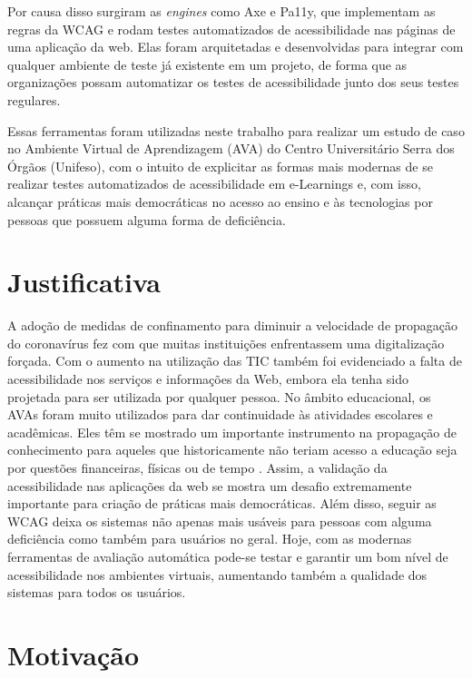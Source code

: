 \documentclass[
	12pt,				%
	openright,			%
	oneside,			%
	a4paper,			%
	chapter=TITLE,		%
	section=TITLE,		%
	subsection=TITLE,	%
	subsubsection=TITLE,%
	english,			%
	brazil				%
	]{abntex2}
\theoremstyle{definition}
\begin{document}
Por causa disso surgiram as \textit{engines} como Axe e Pa11y, que implementam as regras da WCAG e rodam testes automatizados de acessibilidade nas páginas de uma aplicação da web. Elas foram arquitetadas e desenvolvidas para integrar com qualquer ambiente de teste já existente em um projeto, de forma que as organizações possam automatizar os testes de acessibilidade junto dos seus testes regulares.

Essas ferramentas foram utilizadas neste trabalho para realizar um estudo de caso no Ambiente Virtual de Aprendizagem (AVA) do Centro Universitário Serra dos Órgãos (Unifeso), com o intuito de explicitar as formas mais modernas de se realizar testes automatizados de acessibilidade em e-Learnings e, com isso, alcançar práticas mais democráticas no acesso ao ensino e às tecnologias por pessoas que possuem alguma forma de deficiência.


\section{Justificativa}

A adoção de medidas de confinamento para diminuir a velocidade de propagação do coronavírus fez com que muitas instituições enfrentassem uma digitalização forçada. Com o aumento na utilização das TIC também foi evidenciado a falta de acessibilidade nos serviços e informações da Web, embora ela tenha sido projetada para ser utilizada por qualquer pessoa. No âmbito educacional, os AVAs foram muito utilizados para dar continuidade às atividades escolares e acadêmicas. Eles têm se mostrado um importante instrumento na propagação de conhecimento para aqueles que historicamente não teriam acesso a educação seja por questões financeiras, físicas ou de tempo \cite{sharma2014quantitative}. Assim, a validação da acessibilidade nas aplicações da web se mostra um desafio extremamente importante para criação de práticas mais democráticas. Além disso, seguir as WCAG deixa os sistemas não apenas mais usáveis para pessoas com alguma deficiência como também para usuários no geral. Hoje, com as modernas ferramentas de avaliação automática pode-se testar e garantir um bom nível de acessibilidade nos ambientes virtuais, aumentando também a qualidade dos sistemas para todos os usuários.
    
\section{Motivação}
\end{document}
